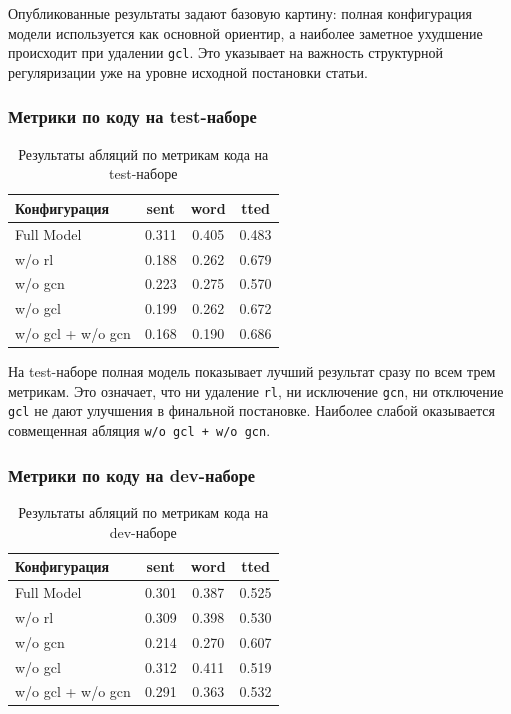 \documentclass[12pt,a4paper]{article}
\begin{document}
Опубликованные результаты задают базовую картину: полная конфигурация модели используется как основной ориентир, а наиболее заметное ухудшение происходит при удалении \texttt{gcl}. Это указывает на важность структурной регуляризации уже на уровне исходной постановки статьи.

\subsubsection{Метрики по коду на test-наборе}

\begin{table}[H]
\centering
\caption{Результаты абляций по метрикам кода на test-наборе}
\begin{tabular}{lccc}
\toprule
Конфигурация & sent & word & tted \\
\midrule
Full Model & 0.311 & 0.405 & 0.483 \\
w/o rl & 0.188 & 0.262 & 0.679 \\
w/o gcn & 0.223 & 0.275 & 0.570 \\
w/o gcl & 0.199 & 0.262 & 0.672 \\
w/o gcl + w/o gcn & 0.168 & 0.190 & 0.686 \\
\bottomrule
\end{tabular}
\end{table}

На test-наборе полная модель показывает лучший результат сразу по всем трем метрикам. Это означает, что ни удаление \texttt{rl}, ни исключение \texttt{gcn}, ни отключение \texttt{gcl} не дают улучшения в финальной постановке. Наиболее слабой оказывается совмещенная абляция \texttt{w/o gcl + w/o gcn}.

\subsubsection{Метрики по коду на dev-наборе}

\begin{table}[H]
\centering
\caption{Результаты абляций по метрикам кода на dev-наборе}
\begin{tabular}{lccc}
\toprule
Конфигурация & sent & word & tted \\
\midrule
Full Model & 0.301 & 0.387 & 0.525 \\
w/o rl & 0.309 & 0.398 & 0.530 \\
w/o gcn & 0.214 & 0.270 & 0.607 \\
w/o gcl & 0.312 & 0.411 & 0.519 \\
w/o gcl + w/o gcn & 0.291 & 0.363 & 0.532 \\
\bottomrule
\end{tabular}
\end{table}
\end{document}
